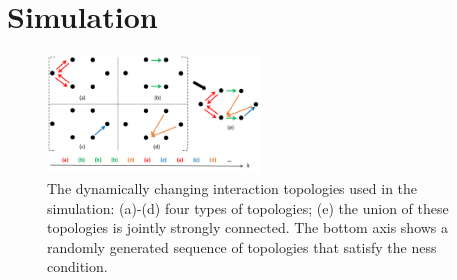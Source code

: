 \section{Simulation}\label{sec:sim}

	\begin{figure}		
		\includegraphics[width=0.5\textwidth]{figures/switch_topo}
		\caption{The dynamically changing interaction topologies used in the simulation: (a)-(d) four types of topologies; (e) the union of these topologies is jointly strongly connected. The bottom axis shows a randomly generated sequence of topologies that satisfy the \fc ness condition.}\label{fig:com_topo}		
	\end{figure}		
			
